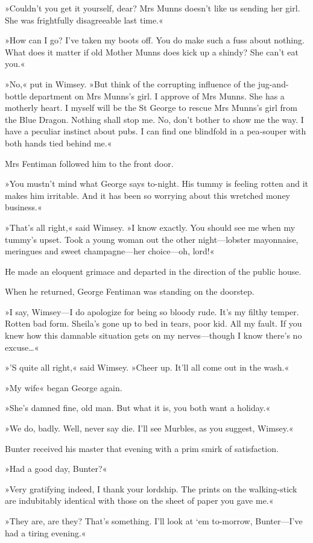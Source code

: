 »Couldn't you get it yourself, dear? Mrs Munns doesn't like us sending her girl. She was frightfully disagreeable last time.«

»How can I go? I've taken my boots off. You do make such a fuss about nothing. What does it matter if old Mother Munns does kick up a shindy? She can't eat you.«

»No,« put in Wimsey. »But think of the corrupting influence of the jug-and-bottle department on Mrs Munns's girl. I approve of Mrs Munns. She has a motherly heart. I myself will be the St George to rescue Mrs Munns's girl from the Blue Dragon. Nothing shall stop me. No, don't bother to show me the way. I have a peculiar instinct about pubs. I can find one blindfold in a pea-souper with both hands tied behind me.«

Mrs Fentiman followed him to the front door.

»You mustn't mind what George says to-night. His tummy is feeling rotten and it makes him irritable. And it has been so worrying about this wretched money business.«

»That's all right,« said Wimsey. »I know exactly. You should see me when my tummy's upset. Took a young woman out the other night—lobster mayonnaise, meringues and sweet champagne—her choice—oh, lord!«

He made an eloquent grimace and departed in the direction of the public house.

When he returned, George Fentiman was standing on the doorstep.

»I say, Wimsey—I do apologize for being so bloody rude. It's my filthy temper. Rotten bad form. Sheila's gone up to bed in tears, poor kid. All my fault. If you knew how this damnable situation gets on my nerves—though I know there's no excuse\dots«

»'S quite all right,« said Wimsey. »Cheer up. It'll all come out in the wash.«

»My wife\longdash« began George again.

»She's damned fine, old man. But what it is, you both want a holiday.«

»We do, badly. Well, never say die. I'll see Murbles, as you suggest, Wimsey.«

Bunter received his master that evening with a prim smirk of satisfaction.

»Had a good day, Bunter?«

»Very gratifying indeed, I thank your lordship. The prints on the walking-stick are indubitably identical with those on the sheet of paper you gave me.«

»They are, are they? That's something. I'll look at `em to-morrow, Bunter—I've had a tiring evening.«